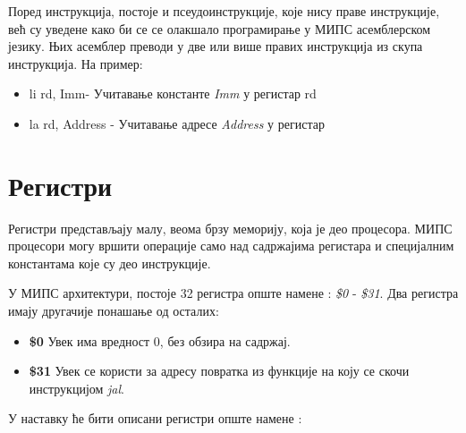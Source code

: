 \documentclass[12pt,oneside]{memoir}
\begin{document}
Поред инструкција, постоје и псеудоинструкције, које нису праве инструкције, већ су уведене како би се се олакшало програмирање у МИПС асемблерском језику. Њих асемблер преводи у две или више правих инструкција из скупа инструкција.
На пример:
\begin{itemize}
\item li rd, Imm- Учитавање константе \textit{Imm} у регистар rd
\item la rd, Address - Учитавање адресе \textit{Address} у регистар
\end{itemize}

\section{Регистри}
\label{sec:registers}
Регистри представљају малу, веома брзу меморију, која је део процесора. МИПС процесори могу вршити операције само над садржајима регистара и специјалним константама које су део инструкције.

У МИПС архитектури, постоје 32 регистра опште намене \cite{mips}: \textit{\$0} - \textit{\$31}. Два регистра имају другачије понашање од осталих: 
\begin{itemize}
\item \textbf{\$0} Увек има вредност 0, без обзира на садржај.
\item \textbf{\$31} Увек се користи за адресу повратка из функције на коју се скочи инструкцијом \textit{jal}.
\end{itemize}

У наставку ће бити описани регистри опште намене \cite{mips}:
\end{document}
